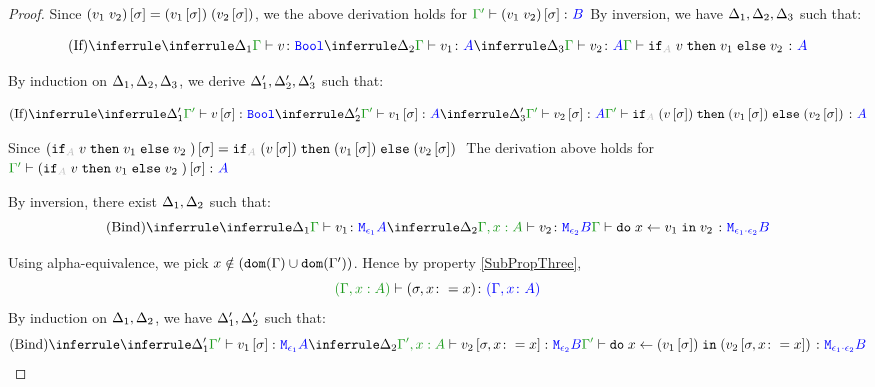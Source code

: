 \documentclass{report}
\begin{document}
\begin{framed}
\begin{proof}
            Since $(v_1\; v_2)\left[\sigma\right] = (v_1\left[\sigma\right])\;(v_2\left[\sigma\right])$, we the above derivation holds for $\typerelation{\G'}{(\apply{v_1}{v_2})\ssi}{B}$
            By inversion, we have $\Delta_1,\Delta_2,\Delta_3$ such that:
        
            \begin{equation}
                \ntreeruleIII{If}{
                    \treeruleI{\D_1}{\typerelation{\G}{v}{\B}}
                    }{
                    \treeruleI{\D_2}{\typerelation{\G}{v_1}{ A}}
                    }{
                    \treeruleI{\D_3}{\typerelation{\G}{v_2}{ A}}
                }{
                    \typerelation{\G}{\pifthenelse{A}{v}{v_1}{v_2}}{ A}
                }
            \end{equation}
        
            By induction on $\Delta_1,\Delta_2, \Delta_3$, we derive 
            $\Delta_1', \Delta_2',\Delta_3'$ such that:
            
            \begin{equation}
                \ntreeruleIII{If}{
                    \treeruleI{\D_1'}{\typerelation{\G'}{v\ssi}{\B}}
                    }{
                    \treeruleI{\D_2'}{\typerelation{\G'}{v_1\ssi}{ A}}
                    }{
                    \treeruleI{\D_3'}{\typerelation{\G'}{v_2\ssi}{ A}}
                }{
                    \typerelation{\G'}{\pifthenelse{A}{(v\ssi)}{(v_1\ssi)}{(v_2\ssi)}}{ A}
                }
            \end{equation}
        
            Since $(\pifthenelse{A}{v}{v_1}{v_2})\ssi = \pifthenelse{A}{(v\ssi)}{(v_1\ssi)}{(v_2\ssi)}$ The derivation above holds for $\typerelation{\G'}{(\pifthenelse{A}{v}{v_1}{v_2})\ssi}{ A}$
        
            By inversion, there exist $\Delta_1, \Delta_2$ such that:
            \begin{equation}
                \ntreeruleII{Bind}{
                    \treeruleI{\D_1}{\typerelation{\G}{v_1}{\M{\e_1}{A}}}
                    }{
                    \treeruleI{\D_2}{\typerelation{\G, x:A}{v_2}{\M{\e_2}{B}}}
                }{\typerelation{\G}{\doin{x}{v_1}{v_2}}{\M{\e_1\dot\e_2}{B}}}
            \end{equation}
        
            Using alpha-equivalence, we pick $x\notin(\texttt{dom}(\Gamma)\cup\texttt{dom}(\Gamma'))$. Hence by property \ref{SubPropThree}, $$\typerelation{(\G, x: A)}{(\si, x\setto x)}{(\gax)}$$
            By induction on $\Delta_1, \Delta_2$, we have $\Delta_1', \Delta_2'$ such that:
            \begin{equation}
                \ntreeruleII{Bind}{
                    \treeruleI{\D_1'}{\typerelation{\G'}{v_1\ssi}{\M{\e_1}{A}}}
                    }{
                    \treeruleI{\D_2}{\typerelation{\G', x:A}{v_2\sub{\si, x\setto x}}{\M{\e_2}{B}}}
                }{\typerelation{\G'}{\doin{x}{(v_1\ssi)}{(v_2\sub{\si, x\setto x})}}{\M{\e_1\dot\e_2}{B}}}
            \end{equation}
        

\end{proof}
\end{framed}
\end{document}
